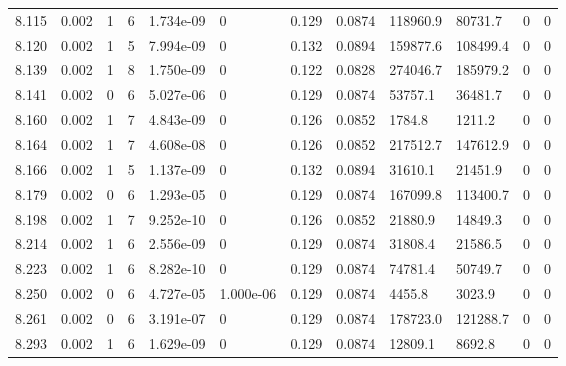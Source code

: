 \documentclass[preview]{standalone}
\begin{document}
{{{{{{{{{\begin{tabular}{L{1.2cm}C{1.2cm} C{0.3cm}C{0.5cm} C{1.4cm}C{1.4cm} C{1.4cm}C{1.4cm} C{1.6cm}C{1.6cm} C{1.6cm}C{1.6cm}}
  8.115  &  0.002  & 1     &  6 &  1.734e-09  & 0  &  0.129&   0.0874& 118960.9 & 80731.7   &  0 & 0  \\ 
  8.120  &  0.002  & 1     &  5 &  7.994e-09  & 0  &  0.132&   0.0894& 159877.6 & 108499.4   &  0 & 0  \\ 
  8.139  &  0.002  & 1     &  8 &  1.750e-09  & 0  &  0.122&   0.0828& 274046.7 & 185979.2   &  0 & 0  \\ 
  8.141  &  0.002  & 0     &  6 &  5.027e-06  & 0  &  0.129&   0.0874& 53757.1 & 36481.7   &  0 & 0  \\ 
  8.160  &  0.002  & 1     &  7 &  4.843e-09  & 0  &  0.126&   0.0852& 1784.8 & 1211.2   &  0 & 0  \\ 
  8.164  &  0.002  & 1     &  7 &  4.608e-08  & 0  &  0.126&   0.0852& 217512.7 & 147612.9   &  0 & 0  \\ 
  8.166  &  0.002  & 1     &  5 &  1.137e-09  & 0  &  0.132&   0.0894& 31610.1 & 21451.9   &  0 & 0  \\ 
  8.179  &  0.002  & 0     &  6 &  1.293e-05  & 0  &  0.129&   0.0874& 167099.8 & 113400.7   &  0 & 0  \\ 
  8.198  &  0.002  & 1     &  7 &  9.252e-10  & 0  &  0.126&   0.0852& 21880.9 & 14849.3   &  0 & 0  \\ 
  8.214  &  0.002  & 1     &  6 &  2.556e-09  & 0  &  0.129&   0.0874& 31808.4 & 21586.5   &  0 & 0  \\ 
  8.223  &  0.002  & 1     &  6 &  8.282e-10  & 0  &  0.129&   0.0874& 74781.4 & 50749.7   &  0 & 0  \\ 
  8.250  &  0.002  & 0     &  6 &  4.727e-05  & 1.000e-06  &  0.129&   0.0874& 4455.8 & 3023.9   &  0 & 0  \\ 
  8.261  &  0.002  & 0     &  6 &  3.191e-07  & 0  &  0.129&   0.0874& 178723.0 & 121288.7   &  0 & 0  \\ 
  8.293  &  0.002  & 1     &  6 &  1.629e-09  & 0  &  0.129&   0.0874& 12809.1 & 8692.8   &  0 & 0  \\ 
\hline 
\end{tabular} 

}}}}}}}}}
\end{document}
